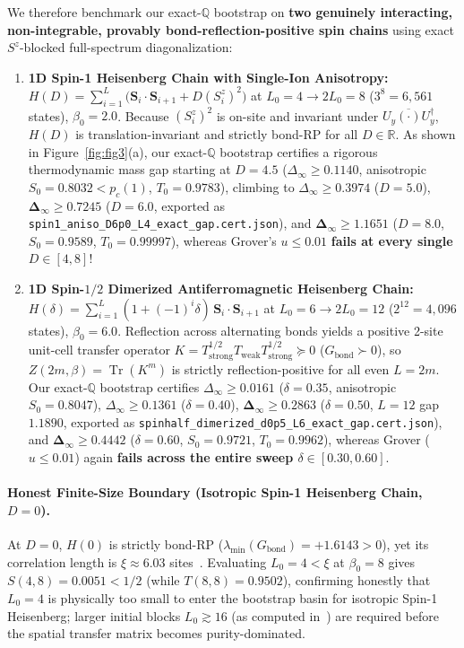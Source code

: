 \documentclass[11pt,a4paper]{article}
\theoremstyle{definition}
\newcommand{\R}{\mathbb{R}}
\newcommand{\Q}{\mathbb{Q}}
\newcommand{\Tr}{\operatorname{Tr}}
\begin{document}
We therefore benchmark our exact-$\Q$ bootstrap on \textbf{two genuinely interacting, non-integrable, provably bond-reflection-positive spin chains} using exact $S^z$-blocked full-spectrum diagonalization:
\begin{enumerate}[leftmargin=1.6em,itemsep=2pt]
  \item \textbf{1D Spin-1 Heisenberg Chain with Single-Ion Anisotropy:} $H(D) = \sum_{i=1}^L \bigl(\mathbf{S}_i\cdot\mathbf{S}_{i+1} + D(S_i^z)^2\bigr)$ at $L_0 = 4 \to 2L_0 = 8$ ($3^8 = 6{,}561$ states), $\beta_0 = 2.0$. Because $(S_i^z)^2$ is on-site and invariant under $U_y \overline{(\cdot)} U_y^\dagger$, $H(D)$ is translation-invariant and strictly bond-RP for all $D \in \R$. As shown in Figure~\ref{fig:fig3}(a), our exact-$\Q$ bootstrap certifies a rigorous thermodynamic mass gap starting at $D = 4.5$ ($\Delta_\infty \ge 0.1140$, anisotropic $S_0 = 0.8032 < p_c(1)$, $T_0 = 0.9783$), climbing to $\Delta_\infty \ge 0.3974$ ($D=5.0$), $\mathbf{\Delta_\infty \ge 0.7245}$ ($D=6.0$, exported as \texttt{spin1\_aniso\_D6p0\_L4\_exact\_gap.cert.json}), and $\mathbf{\Delta_\infty \ge 1.1651}$ ($D=8.0$, $S_0 = 0.9589$, $T_0 = 0.99997$), whereas Grover's $u \le 0.01$ \textbf{fails at every single $D \in [4, 8]$}!
  \item \textbf{1D Spin-$1/2$ Dimerized Antiferromagnetic Heisenberg Chain:} $H(\delta) = \sum_{i=1}^L (1 + (-1)^i \delta)\,\mathbf{S}_i\cdot\mathbf{S}_{i+1}$ at $L_0 = 6 \to 2L_0 = 12$ ($2^{12} = 4{,}096$ states), $\beta_0 = 6.0$. Reflection across alternating bonds yields a positive 2-site unit-cell transfer operator $K = T_{\mathrm{strong}}^{1/2} T_{\mathrm{weak}} T_{\mathrm{strong}}^{1/2} \succeq 0$ ($G_{\mathrm{bond}} \succ 0$), so $Z(2m,\beta) = \Tr(K^m)$ is strictly reflection-positive for all even $L = 2m$. Our exact-$\Q$ bootstrap certifies $\Delta_\infty \ge 0.0161$ ($\delta = 0.35$, anisotropic $S_0 = 0.8047$), $\Delta_\infty \ge 0.1361$ ($\delta = 0.40$), $\mathbf{\Delta_\infty \ge 0.2863}$ ($\delta = 0.50$, $L=12$ gap $1.1890$, exported as \texttt{spinhalf\_dimerized\_d0p5\_L6\_exact\_gap.cert.json}), and $\mathbf{\Delta_\infty \ge 0.4442}$ ($\delta = 0.60$, $S_0 = 0.9721$, $T_0 = 0.9962$), whereas Grover ($u \le 0.01$) again \textbf{fails across the entire sweep $\delta \in [0.30, 0.60]$}.
\end{enumerate}

\paragraph{Honest Finite-Size Boundary (Isotropic Spin-1 Heisenberg Chain, $D = 0$).}
At $D = 0$, $H(0)$ is strictly bond-RP ($\lambda_{\min}(G_{\mathrm{bond}}) = +1.6143 > 0$), yet its correlation length is $\xi \approx 6.03$ sites~\cite{White1993DMRG}. Evaluating $L_0 = 4 < \xi$ at $\beta_0 = 8$ gives $S(4,8) = 0.0051 < 1/2$ (while $T(8,8) = 0.9502$), confirming honestly that $L_0 = 4$ is physically too small to enter the bootstrap basin for isotropic Spin-1 Heisenberg; larger initial blocks $L_0 \gtrsim 16$ (as computed in~\cite{OpenAI2026Haldane}) are required before the spatial transfer matrix becomes purity-dominated.
\end{document}
